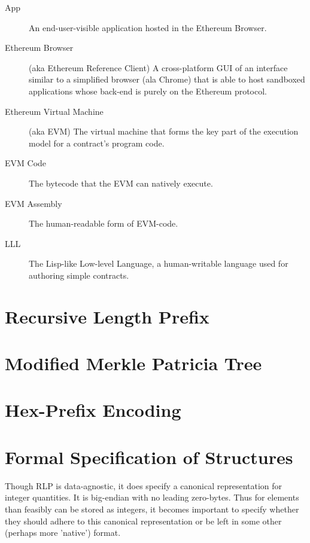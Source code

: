 \documentclass[9pt,oneside]{amsart}
\begin{document}
\begin{multicols}{2}
\begin{description}
\item[App] An end-user-visible application hosted in the Ethereum Browser.

\item[Ethereum Browser] (aka Ethereum Reference Client) A cross-platform GUI of an interface similar to a simplified browser (ala Chrome) that is able to host sandboxed applications whose back-end is purely on the Ethereum protocol.

\item[Ethereum Virtual Machine] (aka EVM) The virtual machine that forms the key part of the execution model for a contract's program code.

\item[EVM Code] The bytecode that the EVM can natively execute.

\item[EVM Assembly] The human-readable form of EVM-code.

\item[LLL] The Lisp-like Low-level Language, a human-writable language used for authoring simple contracts.

\end{description}

\section{Recursive Length Prefix}\label{app:rlp}

\section{Modified Merkle Patricia Tree}\label{app:trie}

\section{Hex-Prefix Encoding}\label{app:hexprefix}

\section{Formal Specification of Structures}

Though RLP is data-agnostic, it does specify a canonical representation for integer quantities. It is big-endian with no leading zero-bytes. Thus for elements than feasibly can be stored as integers, it becomes important to specify whether they should adhere to this canonical representation or be left in some other (perhaps more 'native') format.


\end{multicols}
\end{document}
